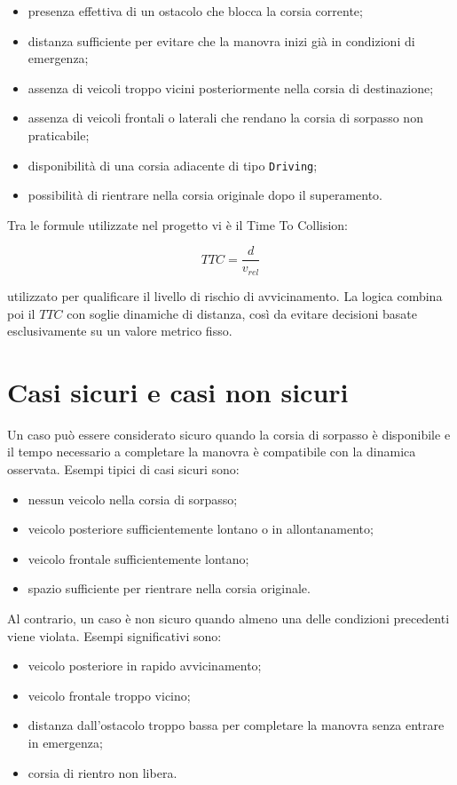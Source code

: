\begin{itemize}
    \item presenza effettiva di un ostacolo che blocca la corsia corrente;
    \item distanza sufficiente per evitare che la manovra inizi già in condizioni di emergenza;
    \item assenza di veicoli troppo vicini posteriormente nella corsia di destinazione;
    \item assenza di veicoli frontali o laterali che rendano la corsia di sorpasso non praticabile;
    \item disponibilità di una corsia adiacente di tipo \texttt{Driving};
    \item possibilità di rientrare nella corsia originale dopo il superamento.
\end{itemize}

Tra le formule utilizzate nel progetto vi è il Time To Collision:

\[
TTC = \frac{d}{v_{rel}}
\]

utilizzato per qualificare il livello di rischio di avvicinamento. La logica combina poi il \(TTC\) con soglie dinamiche di distanza, così da evitare decisioni basate esclusivamente su un valore metrico fisso.

\section{Casi sicuri e casi non sicuri}

Un caso può essere considerato sicuro quando la corsia di sorpasso è disponibile e il tempo necessario a completare la manovra è compatibile con la dinamica osservata. Esempi tipici di casi sicuri sono:

\begin{itemize}
    \item nessun veicolo nella corsia di sorpasso;
    \item veicolo posteriore sufficientemente lontano o in allontanamento;
    \item veicolo frontale sufficientemente lontano;
    \item spazio sufficiente per rientrare nella corsia originale.
\end{itemize}

Al contrario, un caso è non sicuro quando almeno una delle condizioni precedenti viene violata. Esempi significativi sono:

\begin{itemize}
    \item veicolo posteriore in rapido avvicinamento;
    \item veicolo frontale troppo vicino;
    \item distanza dall'ostacolo troppo bassa per completare la manovra senza entrare in emergenza;
    \item corsia di rientro non libera.
\end{itemize}


